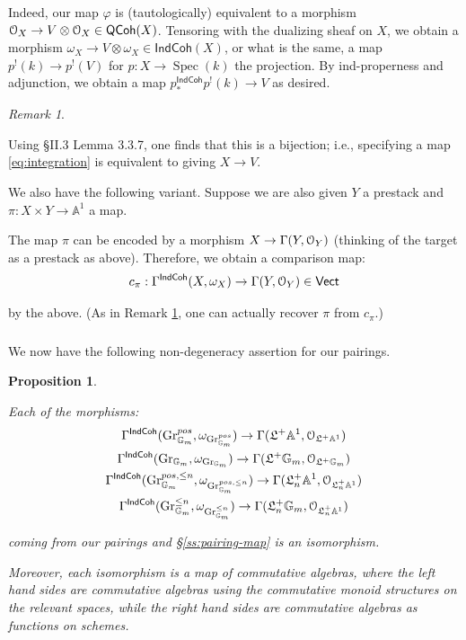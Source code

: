 \documentclass[reqno,11pt]{amsart}
\numberwithin{equation}{subsection}
\newtheorem{prop}[thm]{Proposition}
\theoremstyle{remark}
\newtheorem{rem}[thm]{Remark}
\newcommand{\bA}{{\mathbb A}}
\newcommand{\bG}{{\mathbb G}}
\newcommand{\sO}{{\EuScript O}}
\newcommand{\fL}{{\mathfrak L}}
\newcommand{\on}{\operatorname}
\newcommand{\Spec}{\on{Spec}}
\newcommand{\vph}{\varphi}
\newcommand{\Vect}{\mathsf{Vect}}
\newcommand{\Gr}{\on{Gr}}
\newcommand{\IndCoh}{\mathsf{IndCoh}}
\newcommand{\QCoh}{\mathsf{QCoh}}
\begin{document}
\noindent Indeed, our map $\vph$ is (tautologically) equivalent to
a morphism $\sO_X \to V\otimes \sO_X \in \QCoh(X)$. Tensoring with the dualizing
sheaf on $X$, we obtain a morphism $\omega_X \to V \otimes \omega_X \in \IndCoh(X)$,
or what is the same, a map $p^!(k) \to p^!(V)$ for $p:X \to \Spec(k)$ the projection.
By ind-properness and adjunction, 
we obtain a map $p_*^{\IndCoh}p^!(k) \to V$ as desired. 

\begin{rem}\label{r:upsilon-ff}

Using \cite{grbook} \S II.3 Lemma 3.3.7, one finds that this is a bijection;
i.e., specifying a map \eqref{eq:integration} is equivalent to giving
$X \to V$.

\end{rem}

We also have the following variant.
Suppose we are also given $Y$ a prestack and
$\pi:X \times Y \to \bA^1$ a map.

The map $\pi$ can be encoded by a morphism $X \to \Gamma(Y,\sO_Y)$ (thinking of the target
as a prestack as above). Therefore, 
we obtain a comparison map:
%
\[
c_{\pi}:\Gamma^{\IndCoh}(X,\omega_X) \to \Gamma(Y,\sO_Y) \in 
\Vect
\]

\noindent by the above. (As in Remark \ref{r:upsilon-ff}, 
one can actually recover $\pi$ from $c_{\pi}$.) 

\subsubsection{}

We now have the following non-degeneracy assertion for our
pairings.

\begin{prop}\label{p:cc-log}

Each of the morphisms:
%
\[
\begin{gathered}
\Gamma^{\IndCoh}(\Gr_{\bG_m}^{pos},\omega_{\Gr_{\bG_m}^{pos}}) 
\to \Gamma(\fL^+ \bA^1,\sO_{\fL^+ \bA^1}) \\
\Gamma^{\IndCoh}(\Gr_{\bG_m},\omega_{\Gr_{\bG_m}}) 
\to \Gamma(\fL^+ \bG_m,\sO_{\fL^+ \bG_m}) \\
\Gamma^{\IndCoh}(\Gr_{\bG_m}^{pos,\leq n},\omega_{\Gr_{\bG_m}^{pos,\leq n}}) 
\to \Gamma(\fL_n^+ \bA^1,\sO_{\fL_n^+ \bA^1}) \\
\Gamma^{\IndCoh}(\Gr_{\bG_m}^{\leq n},\omega_{\Gr_{\bG_m}^{\leq n}}) 
\to \Gamma(\fL_n^+ \bG_m,\sO_{\fL_n^+ \bA^1})
\end{gathered}
\]

\noindent coming from our pairings and \S \ref{ss:pairing-map}
is an isomorphism.

Moreover, each isomorphism is a map of commutative algebras,
where the left hand sides are commutative algebras using
the commutative monoid structures on the relevant spaces,
while the right hand sides are commutative algebras 
as functions on schemes.

\end{prop}
\end{document}
